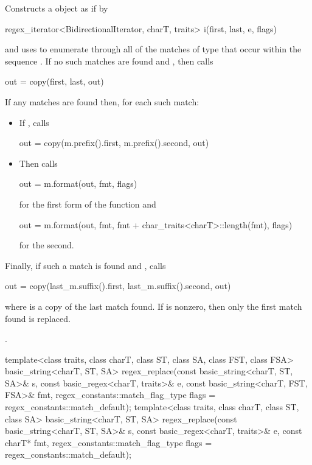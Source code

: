 \begin{itemdescr}
\pnum
{}%
%
\effects
Constructs a  object 
as if by
\begin{codeblock}
regex_iterator<BidirectionalIterator, charT, traits> i(first, last, e, flags)
\end{codeblock}
and uses  to enumerate through all
of the matches  of type 
that occur within the sequence .
If no such
matches are found and
, then calls
\begin{codeblock}
out = copy(first, last, out)
\end{codeblock}
If any matches are found then, for each such match:
\begin{itemize}
\item
If , calls
\begin{codeblock}
out = copy(m.prefix().first, m.prefix().second, out)
\end{codeblock}
\item
Then calls
\begin{codeblock}
out = m.format(out, fmt, flags)
\end{codeblock}
for the first form of the function and
\begin{codeblock}
out = m.format(out, fmt, fmt + char_traits<charT>::length(fmt), flags)
\end{codeblock}
for the second.
\end{itemize}
Finally, if such a match
is found and ,
calls
\begin{codeblock}
out = copy(last_m.suffix().first, last_m.suffix().second, out)
\end{codeblock}
where  is a copy of the last match
found. If 
is nonzero, then only the first match found is replaced.

\pnum\returns {}.
\end{itemdescr}

%
\begin{itemdecl}
template<class traits, class charT, class ST, class SA, class FST, class FSA>
  basic_string<charT, ST, SA>
    regex_replace(const basic_string<charT, ST, SA>& s,
                  const basic_regex<charT, traits>& e,
                  const basic_string<charT, FST, FSA>& fmt,
                  regex_constants::match_flag_type flags = regex_constants::match_default);
template<class traits, class charT, class ST, class SA>
  basic_string<charT, ST, SA>
    regex_replace(const basic_string<charT, ST, SA>& s,
                  const basic_regex<charT, traits>& e,
                  const charT* fmt,
                  regex_constants::match_flag_type flags = regex_constants::match_default);
\end{itemdecl}


